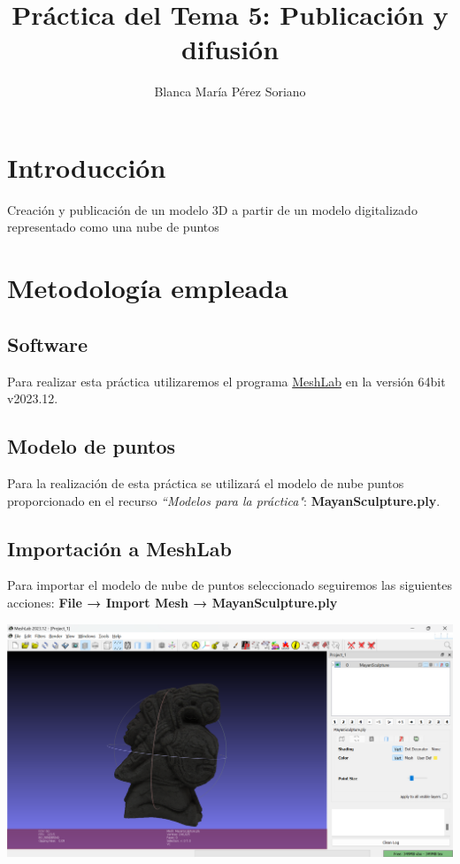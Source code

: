 \documentclass[options]{article}
\title{Práctica del Tema 5: Publicación y difusión}
\author{Blanca María Pérez Soriano}
\begin{document}
\maketitle

\pagebreak

\tableofcontents

\pagebreak

\section{Introducción}
Creación y publicación de un modelo 3D a partir de un modelo digitalizado representado como una nube de puntos


\section{Metodología empleada}
\subsection{Software}
Para realizar esta práctica utilizaremos el programa \href{https://www.meshlab.net/}{MeshLab} en la versión 64bit v2023.12.
\subsection{Modelo de puntos}
Para la realización de esta práctica se utilizará el modelo de nube puntos proporcionado en el recurso \textit{``Modelos para la práctica"}: \textbf{MayanSculpture.ply}.
\subsection{Importación a MeshLab}

Para importar el modelo de nube de puntos seleccionado seguiremos las siguientes acciones: \textbf{File → Import Mesh → MayanSculpture.ply}
\begin{center}
    \includegraphics[scale=0.35]{images/presentacion_importacion.png}    
\end{center}
\end{document}
